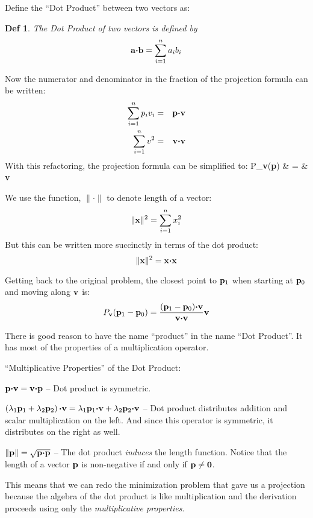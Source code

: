 \documentclass[12pt]{article}
\newtheorem{DD}{Def}
\begin{document}
{Define the ``Dot Product'' between two vectors as: 
\begin{DD}{The Dot Product of two vectors is defined by}
$${\bf a} {\boldsymbol \cdot} {\bf b} = \sum_{i=1}^n a_i b_i$$
\end{DD}
Now the numerator and denominator in the fraction of the projection 
formula can be written:
\begin{eqnarray*}
  \sum_{i=1}^n p_i v_i & = & {\bf p} {\boldsymbol \cdot} {\bf v} \\
  \sum_{i=1}^n v^2 & = & {\bf v} {\boldsymbol \cdot} {\bf v}
\end{eqnarray*}
With this refactoring, the projection formula can be simplified to:
\be
  P_{\bf v}({\bf p}) & = &  {\bf v}
\ee

We use the function, $\| \cdot \|$ to denote length of a vector:
$$ \|{\bf x}\|^2 = \sum_{i=1}^n x_i^2$$
But this can be written more succinctly in terms of the dot product: 
$$ \|{\bf x}\|^2 = {\bf x} {\boldsymbol \cdot} {\bf x} $$


Getting back to the original problem, the closest point to ${\bf p}_1$ when
starting at ${\bf p}_0$ and moving along ${\bf v}$ is:
$$ P_{\bf v}({\bf p}_1 - {\bf p}_0) = \frac{({\bf p}_1 - {\bf p}_0) 
    {\boldsymbol \cdot}{\bf v}}{{\bf v} {\boldsymbol \cdot} {\bf v}} {\bf v}$$

There is good reason to have the name ``product'' in the name ``Dot Product''. 
It has most of the properties of a multiplication operator.

``Multiplicative Properties'' of the Dot Product:
\bi
  \item{${\bf p} {\boldsymbol \cdot} {\bf v} = {\bf v} 
      {\boldsymbol \cdot} {\bf p} $ -- Dot product is symmetric.}
  \item{$\left(\lambda_1 {\bf p}_1 + \lambda_2 {\bf p}_2\right) 
      {\boldsymbol \cdot} {\bf v} = \lambda_1 {\bf p}_1 {\boldsymbol \cdot} {\bf v} + 
      \lambda_2 {\bf p}_2 {\boldsymbol \cdot} {\bf v} $ 
    -- Dot product distributes addition and scalar multiplication on the left. 
    And since this operator is symmetric, it distributes on the right as well.}
  \item{$\|{\bf p}\| = \sqrt{{\bf p} {\boldsymbol \cdot} {\bf p}}$ -- 
    The dot product {\em induces\/} the length function. 
    Notice that the length of a vector ${\bf p}$ is non-negative if and only 
    if ${\bf p} \neq {\bf 0}$.}
\ei

This means that we can redo the minimization problem that gave us a 
projection because the algebra of the dot product is like multiplication 
and the derivation proceeds using only the {\em multiplicative properties\/}.

}
\end{document}
